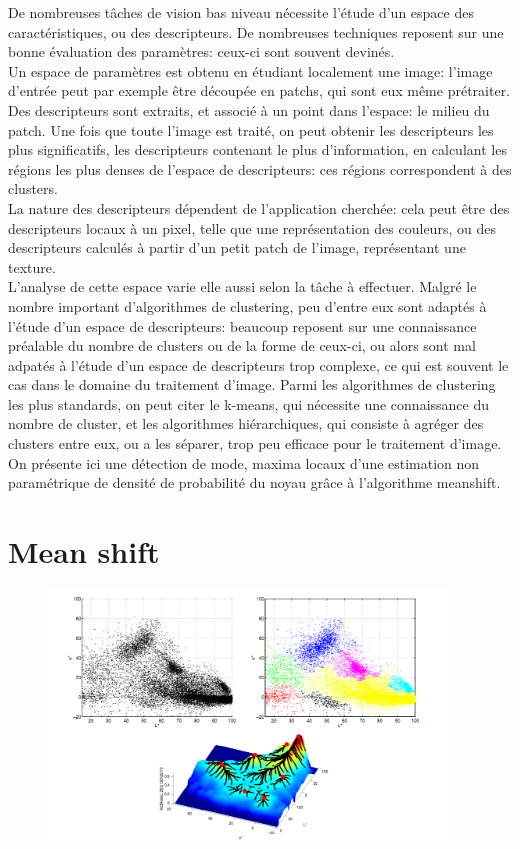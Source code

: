 \documentclass{article}
\begin{document}
De nombreuses tâches de vision bas niveau nécessite l'étude d'un espace des
caractéristiques, ou des descripteurs. De nombreuses techniques reposent sur
une bonne évaluation des paramètres: ceux-ci sont souvent devinés. \\
Un espace de paramètres est obtenu en étudiant localement une image: l'image
d'entrée peut par exemple être découpée en patchs, qui sont eux même
prétraiter. Des descripteurs sont extraits, et associé à un point dans
l'espace: le milieu du patch. Une fois que toute l'image est traité, on peut
obtenir les descripteurs les plus significatifs, les descripteurs
contenant le plus d'information,  en calculant les régions les plus denses de
l'espace de descripteurs: ces régions correspondent à des clusters. \\
La nature des descripteurs dépendent de l'application cherchée: cela peut être
des descripteurs locaux à un pixel, telle que une représentation des couleurs,
ou des descripteurs calculés à partir d'un petit patch de l'image,
représentant une texture. \\
L'analyse de cette espace varie elle aussi selon la tâche à effectuer. Malgré
le nombre important d'algorithmes de clustering, peu d'entre eux sont adaptés à
l'étude d'un espace de descripteurs: beaucoup reposent sur une connaissance
préalable du nombre de clusters ou de la forme de ceux-ci, ou alors sont mal
adpatés à l'étude d'un espace de descripteurs trop complexe, ce qui est
souvent le cas dans le domaine du traitement d'image. Parmi les algorithmes de
clustering les plus standards, on peut citer le k-means, qui nécessite une
connaissance du nombre de cluster, et les algorithmes hiérarchiques, qui
consiste à agréger des clusters entre eux, ou a les séparer, trop peu
efficace pour le traitement d'image. \\
On présente ici une détection de mode, maxima locaux d'une estimation non
paramétrique de densité de probabilité du noyau grâce à l'algorithme meanshift.


\section{Mean shift}

\begin{figure}
\begin{center}
\includegraphics[width=400px]{images/mean_shift_color_space.png}
\end{center}
\end{figure}
\end{document}

